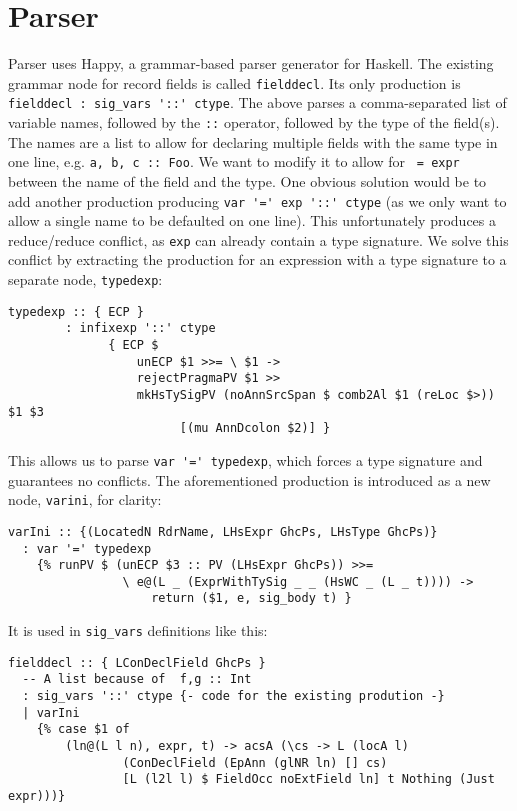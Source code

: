 \documentclass[en]{pracamgr}
\newcommand{\code}[1]{\lstinline[breaklines=true]{#1}}
\begin{document}
\section{Parser}\label{impl:parser}
Parser uses Happy, a grammar-based parser generator for Haskell.
The existing grammar node for record fields is called \code{fielddecl}.
Its only production is \lstinline[breaklines=true]{fielddecl : sig_vars '::' ctype}.
The above parses a comma-separated list of variable names, followed by the \code{::} operator, followed by the type of the field(s).
The names are a list to allow for declaring multiple fields with the same type in one line, e.g. \code{a, b, c :: Foo}.
We want to modify it to allow for \code{ = expr} between the name of the field and the type.
One obvious solution would be to add another production producing \code{var '=' exp '::' ctype} (as we only want to allow a single name to be defaulted on one line).
This unfortunately produces a reduce/reduce conflict, as \code{exp} can already contain a type signature. 
We solve this conflict by extracting the production for an expression with a type signature to a separate node, \code{typedexp}:

\begin{lstlisting}
typedexp :: { ECP }
        : infixexp '::' ctype
              { ECP $
                  unECP $1 >>= \ $1 ->
                  rejectPragmaPV $1 >>
                  mkHsTySigPV (noAnnSrcSpan $ comb2Al $1 (reLoc $>)) $1 $3
                        [(mu AnnDcolon $2)] }

\end{lstlisting}

This allows us to parse \code{var '=' typedexp}, which forces a type signature and guarantees no conflicts.
The aforementioned production is introduced as a new node, \code{varini}, for clarity:
\begin{lstlisting}
varIni :: {(LocatedN RdrName, LHsExpr GhcPs, LHsType GhcPs)}
  : var '=' typedexp
    {% runPV $ (unECP $3 :: PV (LHsExpr GhcPs)) >>=
                \ e@(L _ (ExprWithTySig _ _ (HsWC _ (L _ t)))) -> 
                    return ($1, e, sig_body t) }
\end{lstlisting}

It is used in \code{sig_vars} definitions like this:
\begin{lstlisting}
fielddecl :: { LConDeclField GhcPs }
  -- A list because of  f,g :: Int
  : sig_vars '::' ctype {- code for the existing prodution -}
  | varIni
    {% case $1 of
        (ln@(L l n), expr, t) -> acsA (\cs -> L (locA l) 
                (ConDeclField (EpAnn (glNR ln) [] cs)
                [L (l2l l) $ FieldOcc noExtField ln] t Nothing (Just expr)))}
\end{lstlisting}
\end{document}
